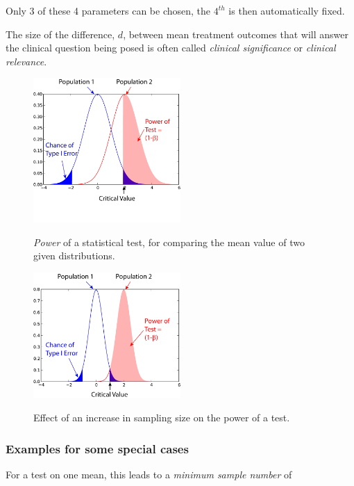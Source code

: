 Only 3 of these 4 parameters can be chosen, the $4^{th}$ is then automatically fixed.

The size of the difference, $d$, between mean treatment outcomes that will answer the clinical question being posed is often called \emph{clinical significance} or \emph{clinical relevance}.

\begin{figure}[!ht]
  \centering
  \includegraphics[width=0.5\textwidth]{../Images/power1.png}\\
  \caption{\emph{Power} of a statistical test, for comparing the mean value of two given distributions.}\label{fig:power1}
\end{figure}

\begin{figure}[!ht]
  \centering
  \includegraphics[width=0.5\textwidth]{../Images/power2.png}\\
  \caption{Effect of an increase in sampling size on the power of a test.}\label{fig:power2}
\end{figure}

\subsubsection{ Examples for some special cases }

For a test on one mean, this leads to a \emph{minimum sample number} of

